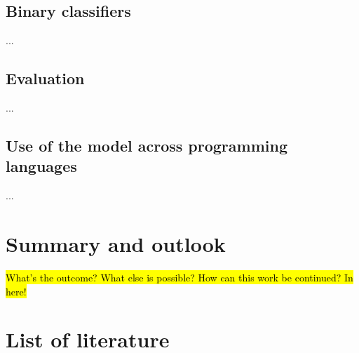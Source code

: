 \documentclass[10pt]{article}
\begin{document}
		\subsection{Binary classifiers}
			\noindent ...
		
		\subsection{Evaluation}
			\noindent ...
		
		\subsection{Use of the model across programming languages}
			\noindent ...



	\pagebreak
	\section{Summary and outlook}
		\hl{What's the outcome? What else is possible? How can this work be continued? In here!}


	\pagebreak
	\renewcommand{\listfigurename}{List of figures}
	\listoffigures
	\listoftables
	


	\pagebreak	
	\section*{List of literature}
		\printbibliography[heading=none]
	


	\pagebreak	
\end{document}
